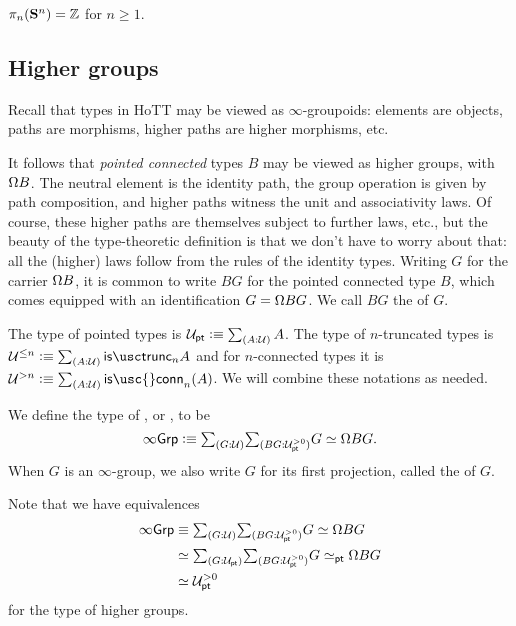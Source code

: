 \begin{thm}
  $\pi_n(\mathbf{S}^{n})={\mathbb{Z}}$ for $n\geq 1$.
\end{thm}

\subsection{Higher groups}
\label{sec:higher-groups}

Recall that types in HoTT may be viewed as $\infty$-groupoids:
elements are objects, paths are morphisms, higher paths are higher
morphisms, etc.

It follows that \emph{pointed connected} types $B$ may be viewed as higher
groups, with  $\Omega B$.
The neutral element is the identity path,
the group operation is given by path composition,
and higher paths witness the unit and associativity laws.
Of course, these higher paths are themselves subject to further laws,
etc., but the beauty of the type-theoretic definition is
that we don't have to worry about that:
all the (higher) laws follow from the rules of the identity types.
Writing $G$ for the carrier $\Omega B$, it is common to write $BG$ for the pointed
connected type $B$, which comes equipped with an identification $G = \Omega BG$.
We call $BG$ the  of $G$.

The type of pointed types is
$\UU_\pt \defeq  \sm{A:\UU} A$. The type of $n$-truncated types is
$\UU^{\le n} \defeq  \sm{A:\UU}\istrunc{n}{A}$ and for $n$-connected types it is
$\UU^{>n} \defeq  \sm{A:\UU}\mathsf{is\usc{}conn}_n(A)$. We will combine these notations as needed.

\begin{defn}
We define the type of , or , to be
\begin{equation*}
\infty\mathsf{Grp}\defeq \sm{G:\UU}{BG:\UU_\pt^{>0}} \eqv{G}{\loopspacesym BG}.
\end{equation*}
When $G$ is an $\infty$-group, we also write $G$ for its first projection, called the  of $G$.
\end{defn}

\begin{rmk}
Note that we have equivalences
\begin{align*}
  \infty\mathsf{Grp}
  &\jdeq   \sm{G:\UU}{BG:\UU_\pt^{>0}} \eqv{G}{\loopspacesym BG} \\
  &\eqvsym \sm{G:\UU_\pt}{BG:\UU_\pt^{>0}} G \eqvsym_\pt \loopspacesym BG \\
  &\eqvsym \UU_\pt^{>0}
\end{align*}
for the type of higher groups. 
\end{rmk}

